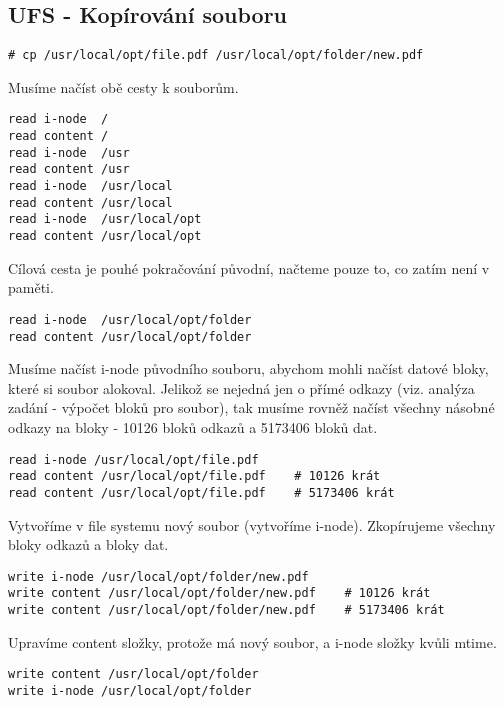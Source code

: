 \subsection{UFS - Kopírování souboru}

\begin{verbatim}
# cp /usr/local/opt/file.pdf /usr/local/opt/folder/new.pdf
\end{verbatim}

Musíme načíst obě cesty k souborům.
\begin{verbatim}
read i-node  /
read content /
read i-node  /usr
read content /usr
read i-node  /usr/local
read content /usr/local
read i-node  /usr/local/opt
read content /usr/local/opt
\end{verbatim}

Cílová cesta je pouhé pokračování původní, načteme pouze to, co zatím není v paměti.
\begin{verbatim}
read i-node  /usr/local/opt/folder
read content /usr/local/opt/folder
\end{verbatim}

Musíme načíst i-node původního souboru, abychom mohli načíst datové bloky, které si soubor alokoval. Jelikož se nejedná jen o přímé odkazy (viz. analýza zadání - výpočet bloků pro soubor), tak musíme rovněž načíst všechny násobné odkazy na bloky - 10126 bloků odkazů a 5173406 bloků dat.
\begin{verbatim}
read i-node /usr/local/opt/file.pdf
read content /usr/local/opt/file.pdf    # 10126 krát
read content /usr/local/opt/file.pdf    # 5173406 krát
\end{verbatim}

Vytvoříme v file systemu nový soubor (vytvoříme i-node). Zkopírujeme všechny bloky odkazů a bloky dat.
\begin{verbatim}
write i-node /usr/local/opt/folder/new.pdf
write content /usr/local/opt/folder/new.pdf    # 10126 krát
write content /usr/local/opt/folder/new.pdf    # 5173406 krát
\end{verbatim}

Upravíme content složky, protože má nový soubor, a i-node složky kvůli mtime.
\begin{verbatim}
write content /usr/local/opt/folder
write i-node /usr/local/opt/folder
\end{verbatim}

